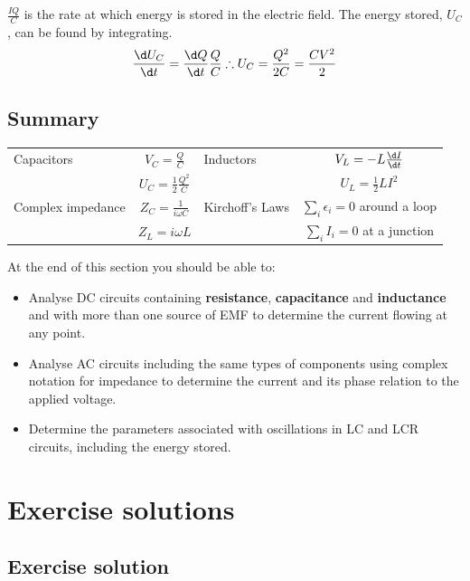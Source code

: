 \documentclass[
]{book}
\begin{document}
\(\frac{IQ}{C}\) is the rate at which energy is stored in the electric
field. The energy stored, \(U_C\), can be found by integrating.
\[\begin{aligned}
\frac{\d U_C}{\d t} = \frac{\d Q}{\d t} \frac{Q}{C} \therefore U_C = \frac{Q^2}{2C} = \frac{CV^2}{2}
\end{aligned}\]

\hypertarget{summary-1}{%
\section{Summary}\label{summary-1}}

\protect\hypertarget{tab:summary}{}{}

\begin{longtable}[]{@{}lclc@{}}
\toprule\noalign{}
\endhead
\bottomrule\noalign{}
\endlastfoot
Capacitors & \(V_C = \frac{Q}{C}\) & Inductors & \(V_L = -L \frac{\d I}{\d t}\) \\
& \(U_C = \frac{1}{2} \frac{Q^2}{C}\) & & \(U_L = \frac{1}{2} LI^2\) \\
Complex impedance & \(Z_C = \frac{1}{i \omega C}\) & Kirchoff's Laws & \(\sum_i \epsilon_i = 0\) around a loop \\
& \(Z_L = i \omega L\) & & \(\sum_i I_i = 0\) at a junction \\
\end{longtable}

At the end of this section you should be able to:

\begin{itemize}
\item
  Analyse DC circuits containing \textbf{resistance}, \textbf{capacitance} and
  \textbf{inductance} and with more than one source of EMF to determine the
  current flowing at any point.
\item
  Analyse AC circuits including the same types of components using
  complex notation for impedance to determine the current and its
  phase relation to the applied voltage.
\item
  Determine the parameters associated with oscillations in LC and LCR
  circuits, including the energy stored.
\end{itemize}

\hypertarget{sec:Sols}{%
\chapter{Exercise solutions}\label{sec:Sols}}

\hypertarget{ex1Sol}{%
\section*{Exercise solution}\label{ex1Sol}}
\end{document}
